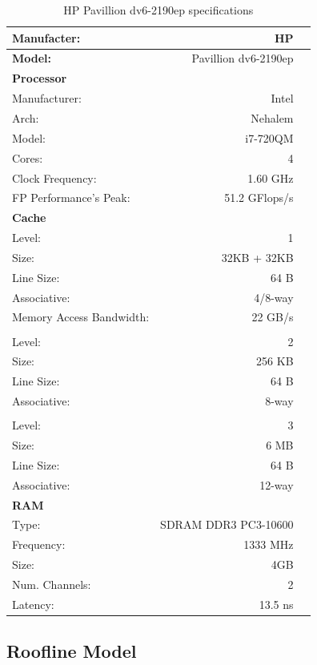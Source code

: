 \documentclass[a4paper,10pt,openright,openbib,twocolumn]{article}
\begin{document}
\begin{table}[!htp]
	\footnotesize
		\begin{tabular}{lrl}
			\hline 
			\textbf{Manufacter:} & HP \\
			\hline 
			\textbf{Model:} & Pavillion dv6-2190ep \\
			\hline 
			\textbf{Processor} & & \\
			Manufacturer: & Intel & \\
			Arch: & Nehalem & \\
			Model: & i7-720QM & \\
			Cores: & 4 & \\
			Clock Frequency: & 1.60 GHz & \\
			FP Performance's Peak: & 51.2 GFlops/s & \\
			\hline 
			\textbf{Cache} & & \\
			Level: & 1 & \\
			Size: & 32KB + 32KB & \\
			Line Size: & 64 B & \\
			Associative: & 4/8-way & \\
			Memory Access Bandwidth: & 22 GB/s & \\
			\\
			Level: & 2 & \\
			Size: & 256 KB & \\
			Line Size: & 64 B & \\
			Associative: & 8-way & \\
			\\
			Level: & 3 & \\
			Size: & 6 MB & \\
			Line Size: & 64 B & \\
			Associative: & 12-way & \\
			\hline 
			\textbf{RAM} \\
			Type: & SDRAM DDR3 PC3-10600 & \\
			Frequency: & 1333 MHz & \\
			Size: & 4GB & \\
			Num. Channels: & 2 & \\
			Latency: & 13.5 ns & \\
		\end{tabular}
		\caption{HP Pavillion dv6-2190ep specifications}
		\label{tab:hp}
\end{table}


\subsection{Roofline Model}
\end{document}
